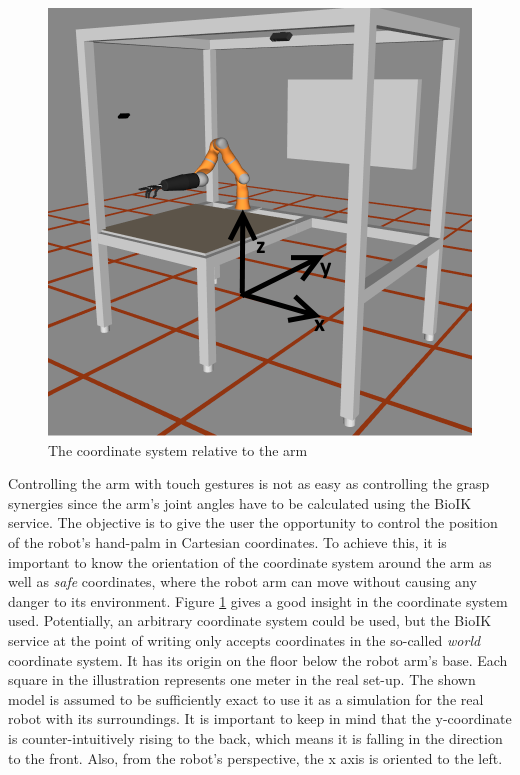 \begin{figure}
	\caption{\label{fig:arm:coord}The coordinate system relative to the arm}
	\includegraphics[width=\linewidth]{assets/chpt_concepts/coordinates.png}
\end{figure}

Controlling the arm with touch gestures is not as easy as controlling the grasp synergies since the arm's joint angles have to be calculated using the BioIK service. The objective is to give the user the opportunity to control the position of the robot's hand-palm in Cartesian coordinates. To achieve this, it is important to know the orientation of the coordinate system around the arm as well as \textit{safe} coordinates, where the robot arm can move without causing any danger to its environment. Figure \ref{fig:arm:coord} gives a good insight in the coordinate system used. Potentially, an arbitrary coordinate system could be used, but the BioIK service at the point of writing only accepts coordinates in the so-called \textit{world} coordinate system. It has its origin on the floor below the robot arm's base. Each square in the illustration represents one meter in the real set-up. The shown model is assumed to be sufficiently exact to use it as a simulation for the real robot with its surroundings. It is important to keep in mind that the y-coordinate is counter-intuitively rising to the back, which means it is falling in the direction to the front. Also, from the robot's perspective, the x axis is oriented to the left.

